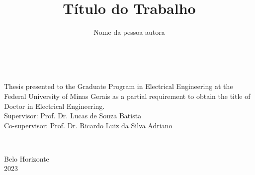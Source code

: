 \documentclass[12pt,a4paper,oneside]{book}
\title{Título do Trabalho}
\author{Nome da pessoa autora}
\begin{document}

    

	\newpage
	\thispagestyle{empty}
	\begin{center}
		\theauthor\\
		\vspace{5cm}
		\textbf{\thetitle}
	\end{center}
	\vspace{5cm}
	\hfill
	\begin{minipage}{8cm}
		Thesis presented to the Graduate Program in Electrical Engineering at the Federal University of Minas Gerais as a partial requirement to obtain the title of Doctor in Electrical Engineering.\\[3mm]
		Supervisor: Prof. Dr. Lucas de Souza Batista \\[3mm]
		Co-supervisor: Prof. Dr. Ricardo Luiz da Silva Adriano
	\end{minipage}\\
	\begin{center}
		\vspace*{\fill}
		Belo Horizonte\\2023
	\end{center}

    

    

    

	

    

	
    
    

	\begingroup
		\pagestyle{empty}
		\listoffigures
		\pagestyle{empty}
		\listoftables
		\pagestyle{empty}
		\listofalgorithms
	\endgroup
	
	
    
    \thispagestyle{empty}
    \tableofcontents

    
    
    
    
    
    

    
    
    
    \appendix
    
\end{document}
